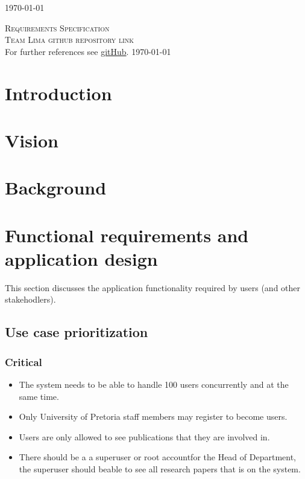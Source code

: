 \documentclass[a4paper,12pt]{report}
\begin{document}
\begin{titlepage}
\begin{center}
{\large \today}
\end{center}
\end{titlepage}
\footnotesize
\normalsize

\renewcommand{\thesection}{\arabic{section}}
\newpage
\begin{center}
\textsc{\LARGE Requirements Specification}\\[1.5cm]
\textsc{\Large Team Lima github repository link}\\[0.5cm]
For further references see \href{https://https://github.com/slugger7/team-lima}{gitHub}.
\today
\end{center}


\newpage
\section{Introduction}

\newpage
\section{Vision}

\newpage
\section{Background}

\newpage
\section{Functional requirements and application design}
This section discusses the application functionality required by users (and other stakehodlers).

\subsection{Use case prioritization}
\subsubsection{Critical}
	\begin{itemize}
		\item The system needs to be able to handle 100 users concurrently and at the same time.
		\item Only University of Pretoria staff members may register to become users.
		\item Users are only allowed to see publications that they are involved in.
		\item There should be a a superuser or root accountfor the Head of Department, the superuser should beable to see all research papers that is on the system.
	\end{itemize}
\end{document}
